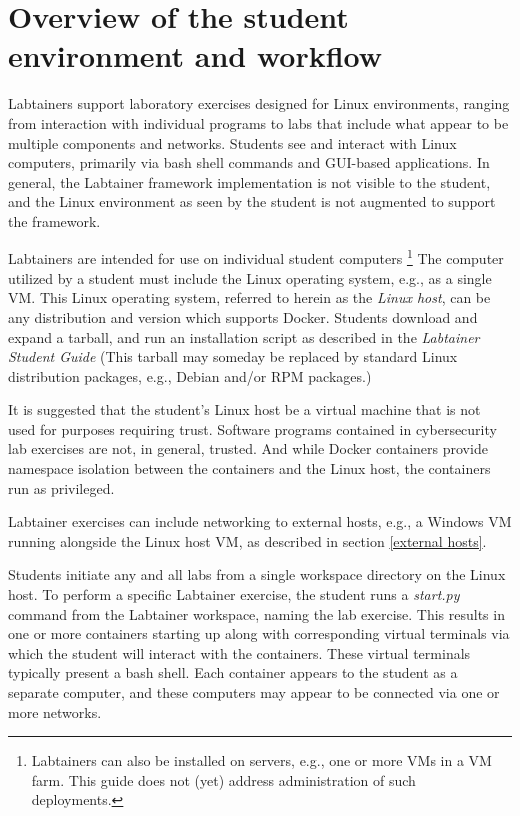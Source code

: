 \documentclass[12pt]{article}
\begin{document}
\section {Overview of the student environment and workflow}
Labtainers support laboratory exercises designed for Linux environments,
ranging from interaction with individual programs to labs that include
what appear to be multiple components and networks.  Students see and interact with Linux
computers, primarily via bash shell commands and GUI-based applications. In general, the Labtainer
framework implementation is not visible to the student, and the Linux
environment as seen by the student is not augmented to support the framework.

Labtainers are intended for use on individual student computers \footnote{Labtainers
can also be installed on servers, e.g., one or more VMs in a VM farm. This guide does
not (yet) address administration of such deployments.}
The computer utilized by a student must include the Linux operating system, e.g.,
as a single VM.  This Linux operating system, referred to herein
as the \textit{Linux host}, can be any distribution and version
which supports Docker.  Students download and expand a tarball, and run
an installation script as described in the \textit{Labtainer Student Guide}
(This tarball may someday be replaced by standard Linux distribution packages,
e.g., Debian and/or RPM packages.)  

It is suggested that the student's Linux host be a virtual machine that is
not used for purposes requiring trust.  Software programs contained in cybersecurity lab
exercises are not, in general, trusted.  And while Docker containers provide namespace
isolation between the containers and the Linux host, the containers run as privileged.

Labtainer exercises can include networking to external hosts, e.g., a Windows VM
running alongside the Linux host VM, as described in section \ref{external hosts}.

Students initiate any and all labs from a
single workspace directory on the Linux host.
To perform a specific Labtainer exercise, the student runs a \textit{start.py} command from
the Labtainer workspace, naming the lab exercise.  This results in one or more
containers starting up along with corresponding virtual terminals via which the 
student will interact with the containers.  These virtual terminals typically
present a bash shell.  Each container appears to the student as a separate
computer, and these computers may appear to be connected via one or more networks.  
\end{document}
